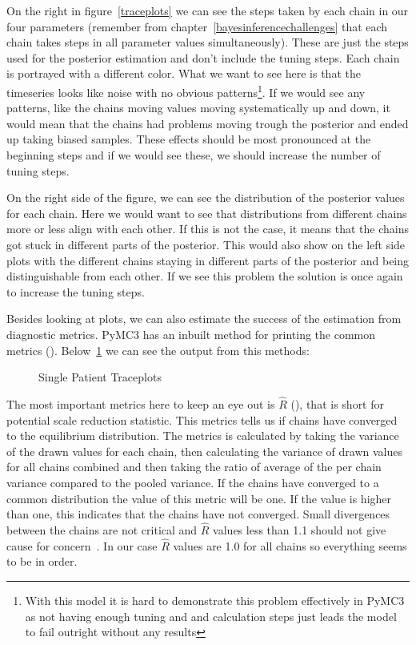 \documentclass[12pt,a4paper,leqno]{report}
\theoremstyle{plain}
\theoremstyle{definition}
\theoremstyle{remark}
\begin{document}
On the right in figure\ \ref{traceplots} we can see the steps taken by each
chain in our four parameters (remember from chapter\ \ref{bayesinferencechallenges} that
each chain takes steps in all parameter values simultaneously). These are
just the steps used for the posterior estimation and don't include the tuning steps. Each
chain is portrayed with a different color. What we want to see here is that the timeseries
looks like noise with no obvious patterns\footnote{With this model it is hard to
demonstrate this problem effectively in PyMC3 as not having enough tuning and and
calculation steps just leads the model to fail outright without any results}. If we would see any patterns, like the chains
moving values moving systematically up and down, it would mean that the
chains had problems moving trough the posterior and ended up taking biased samples.
These effects should be most pronounced at the beginning steps and if we would see
these, we should increase the number of tuning steps.

On the right side of the figure, we can see the distribution of the posterior values for each chain. Here we
would want to see that distributions from different chains more or less align with
each other. If this is not the case, it means that the chains got stuck in different
parts of the posterior. This would also show on the left side plots with the different
chains staying in different parts of the posterior and being distinguishable from each
other. If we see this problem the solution is once again to increase the tuning steps.

Besides looking at plots, we can also estimate the success of the estimation from
diagnostic metrics. PyMC3 has an inbuilt method for printing the common metrics
(). Below\ \ref{singlepatientdiagnosticmetrics} we can see the output from this methods:

\bigskip
\begin{figure}[H]
    \caption{Single Patient Traceplots}\label{singlepatientdiagnosticmetrics}
    \bigskip
    \centering
    
\end{figure}
\bigskip

The most important metrics here to keep an eye out is \(\hat{R}\) (), that is short for potential scale
reduction statistic. This metrics tells us if
chains have converged to the equilibrium distribution. The metrics is calculated by
taking the variance of the drawn values for each chain,
then calculating the variance of drawn values for all chains combined and then taking the
ratio of average of the per chain variance compared to the pooled variance. If the
chains have converged to a common distribution the value of this metric will be one. If
the value is higher than one, this indicates that the chains have not converged. Small
divergences between the chains are not critical and \(\hat{R}\) values less than 1.1 should
not give cause for concern\ \cite{rhatrule}. In our case \(\hat{R}\) values are 1.0 for
all chains so everything seems to be in order.
\end{document}
